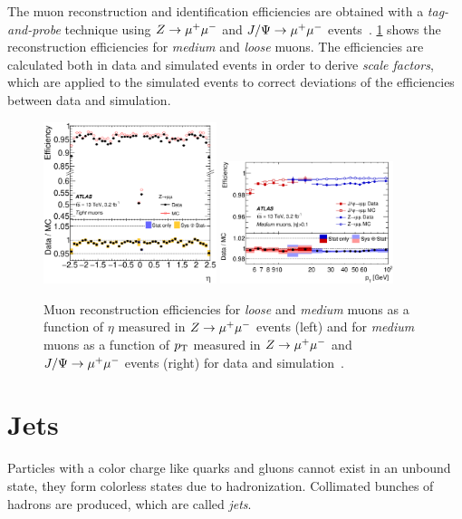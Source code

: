 The muon reconstruction and identification efficiencies are obtained with a \emph{tag-and-probe} technique using
$Z \to \mu^+\mu^-$ and $J/\Psi \to \mu^+\mu^-$ events~\cite{PERF-2015-10}.
\cref{fig:object_selection:mu_id_eff} shows the reconstruction efficiencies for \emph{medium} and \emph{loose} muons.
The efficiencies are calculated both in data and simulated events in order to derive \emph{scale factors}, which are
applied to the simulated events to correct deviations of the efficiencies between data and simulation.

\begin{figure}
    \centering
    \includegraphics[width=0.45\textwidth,align=c]{./figures/object_selection/muon_efficiency_mediumloose_zmm.eps}
    \includegraphics[width=0.45\textwidth,align=c]{./figures/object_selection/muon_efficiency_medium_zmmjpsi.eps}
    \caption{Muon reconstruction efficiencies for \emph{loose} and \emph{medium} muons as a function of $\eta$
            measured in $Z \to \mu^+\mu^-$ events (left) and for \emph{medium} muons as a function of $p_\text{T}$ measured in
            $Z \to \mu^+\mu^-$ and $J/\Psi \to \mu^+\mu^-$ events (right) for data and simulation~\cite{PERF-2015-10}.}\label{fig:object_selection:mu_id_eff}
\end{figure}


\section{Jets}\label{sec:object_selection:jets}

Particles with a color charge like quarks and gluons cannot exist in an unbound state,
they form colorless states due to hadronization.
Collimated bunches of hadrons are produced, which are called \emph{jets}.

